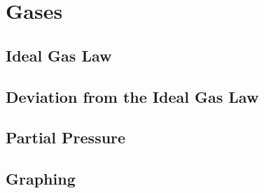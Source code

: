 \documentclass[../main]{subfiles}
\begin{document}
\section{Gases}

\subsection{Ideal Gas Law}

\subsection{Deviation from the Ideal Gas Law}

\subsection{Partial Pressure}

\subsection{Graphing}
\end{document}
